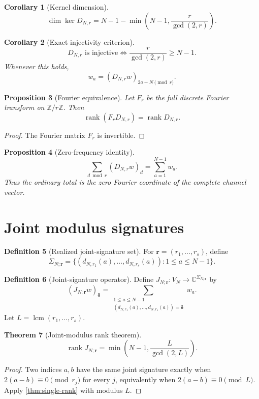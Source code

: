 \documentclass[11pt]{article}
\newtheorem{theorem}{Theorem}[section]
\newtheorem{proposition}[theorem]{Proposition}
\newtheorem{corollary}[theorem]{Corollary}
\theoremstyle{definition}
\newtheorem{definition}[theorem]{Definition}
\newcommand{\C}{\mathbb C}
\newcommand{\Z}{\mathbb Z}
\newcommand{\rank}{\operatorname{rank}}
\newcommand{\lcm}{\operatorname{lcm}}
\begin{document}
\begin{corollary}[Kernel dimension]
\[
\dim\ker D_{N,r}=N-1-\min\!\left(N-1,\frac r{\gcd(2,r)}\right).
\]
\end{corollary}

\begin{corollary}[Exact injectivity criterion]
\[
D_{N,r}\text{ is injective}\iff\frac r{\gcd(2,r)}\ge N-1.
\]
Whenever this holds,
\[
w_a=(D_{N,r}w)_{2a-N\pmod r}.
\]
\end{corollary}

\begin{proposition}[Fourier equivalence]
Let $F_r$ be the full discrete Fourier transform on $\Z/r\Z$. Then
\[
\rank(F_rD_{N,r})=\rank D_{N,r}.
\]
\end{proposition}
\begin{proof}
The Fourier matrix $F_r$ is invertible.
\end{proof}

\begin{proposition}[Zero-frequency identity]
\[
\sum_{d\bmod r}(D_{N,r}w)_d=\sum_{a=1}^{N-1}w_a.
\]
Thus the ordinary total is the zero Fourier coordinate of the complete channel vector.
\end{proposition}

\section{Joint modulus signatures}
\begin{definition}[Realized joint-signature set]
For $\mathbf r=(r_1,\dots,r_s)$, define
\[
\Sigma_{N;\mathbf r}=\{(d_{N,r_1}(a),\dots,d_{N,r_s}(a)):1\le a\le N-1\}.
\]
\end{definition}
\begin{definition}[Joint-signature operator]
Define $J_{N;\mathbf r}:V_N\to\C^{\Sigma_{N;\mathbf r}}$ by
\[
(J_{N;\mathbf r}w)_{\boldsymbol\delta}
=\sum_{\substack{1\le a\le N-1\\(d_{N,r_1}(a),\dots,d_{N,r_s}(a))=\boldsymbol\delta}}w_a.
\]
Let $L=\lcm(r_1,\dots,r_s)$.
\end{definition}

\begin{theorem}[Joint-modulus rank theorem]\label{thm:joint-rank}
\[
\rank J_{N;\mathbf r}=\min\!\left(N-1,\frac L{\gcd(2,L)}\right).
\]
\end{theorem}
\begin{proof}
Two indices $a,b$ have the same joint signature exactly when $2(a-b)\equiv0\pmod{r_j}$ for every $j$, equivalently when $2(a-b)\equiv0\pmod L$. Apply \cref{thm:single-rank} with modulus $L$.
\end{proof}
\end{document}
